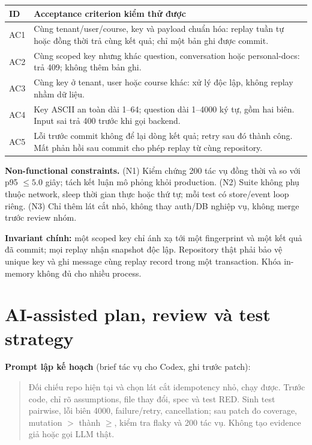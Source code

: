 \documentclass[11pt,a4paper]{article}
\begin{document}
\begin{tabular}{@{}L{10mm}L{\dimexpr\textwidth-10mm-2\tabcolsep\relax}@{}}
\toprule
\textbf{ID} & \textbf{Acceptance criterion kiểm thử được}\\\midrule
AC1 & Cùng tenant/user/course, key và payload chuẩn hóa: replay tuần tự hoặc đồng thời trả cùng kết quả; chỉ một bản ghi được commit.\\[2pt]
AC2 & Cùng scoped key nhưng khác question, conversation hoặc personal-docs: trả 409; không thêm bản ghi.\\[2pt]
AC3 & Cùng key ở tenant, user hoặc course khác: xử lý độc lập, không replay nhầm dữ liệu.\\[2pt]
AC4 & Key ASCII an toàn dài 1--64; question dài 1--4000 ký tự, gồm hai biên. Input sai trả 400 trước khi gọi backend.\\[2pt]
AC5 & Lỗi trước commit không để lại dòng kết quả; retry sau đó thành công. Mất phản hồi sau commit cho phép replay từ cùng repository.\\
\bottomrule
\end{tabular}

\textbf{Non-functional constraints.} (N1) Kiểm chứng 200 tác vụ đồng thời và so với p95 $\leq5.0$ giây; tách kết luận mô phỏng khỏi production. (N2) Suite không phụ thuộc network, sleep thời gian thực hoặc thứ tự; mỗi test có store/event loop riêng. (N3) Chỉ thêm lát cắt nhỏ, không thay auth/DB nghiệp vụ, không merge trước review nhóm.

\textbf{Invariant chính:} một scoped key chỉ ánh xạ tới một fingerprint và một kết quả đã commit; mọi replay nhận snapshot độc lập. Repository thật phải bảo vệ unique key và ghi message cùng replay record trong một transaction. Khóa in-memory không đủ cho nhiều process.

\newpage
\section{AI-assisted plan, review và test strategy}
\textbf{Prompt lập kế hoạch} (brief tác vụ cho Codex, ghi trước patch):
\begin{quote}
Đối chiếu repo hiện tại và chọn lát cắt idempotency nhỏ, chạy được. Trước code, chỉ rõ assumptions, file thay đổi, spec và test RED. Sinh test pairwise, lỗi biên 4000, failure/retry, cancellation; sau patch đo coverage, mutation \(>\) thành \(\geq\), kiểm tra flaky và 200 tác vụ. Không tạo evidence giả hoặc gọi LLM thật.
\end{quote}
\end{document}
